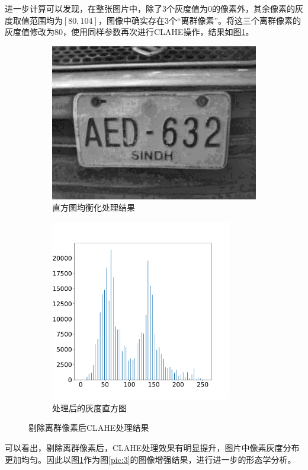 \documentclass[a4paper]{ctexart}
\newcommand{\outwtwo}{0.4\textwidth}
\begin{document}
\begin{spacing}{1.35}
	进一步计算可以发现，在整张图片中，除了3个灰度值为0的像素外，其余像素的灰度取值范围均为$\left[80,104\right]$，图像中确实存在3个“离群像素”。将这三个离群像素的灰度值修改为80，使用同样参数再次进行CLAHE操作，结果如图\ref{fig:3blur_clahe_2}。
	\begin{figure}[htbp]
		\centering
		\begin{subfigure}[t]{\outwtwo}
			\centering
			\includegraphics[width=1.05\textwidth]{figure/3_img_clahe_2.png}
			\caption{直方图均衡化处理结果}
		\end{subfigure}
		\begin{subfigure}[t]{\outwtwo}
			\centering
			\includegraphics[width=0.87\textwidth]{figure/3_img_clahe_2.pdf}
			\caption{处理后的灰度直方图}
		\end{subfigure}
		\caption{剔除离群像素后CLAHE处理结果}
		\label{fig:3blur_clahe_2}
	\end{figure}
	可以看出，剔除离群像素后，CLAHE处理效果有明显提升，图片中像素灰度分布更加均匀。因此以图\ref{fig:3blur_clahe_2}作为图\ref{pic:3}的图像增强结果，进行进一步的形态学分析。


\end{spacing}
\end{document}

